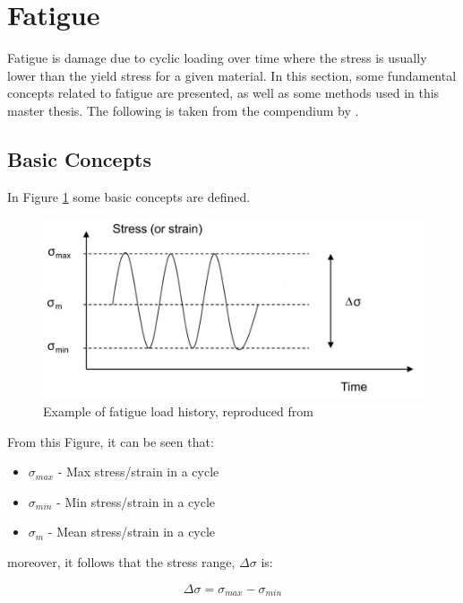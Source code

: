 \section{Fatigue}
Fatigue is damage due to cyclic loading over time where the stress is usually lower than the yield stress for a given material. In this section, some fundamental concepts related to fatigue are presented, as well as some methods used in this master thesis. The following is taken from the compendium by \cite{fatigue2016}. \newline
\newline
\subsection{Basic Concepts}
In Figure \ref{fig:fatigue} some basic concepts are defined. 

\begin{figure}[h!]
\centering
\includegraphics[scale=0.6]{figures/cycle}
\caption[$\; \:$Example of fatigue load history]{Example of fatigue load history, reproduced from  \cite{fatigue2016} }
 \label{fig:fatigue}
\end{figure}

From this Figure, it can be seen that:
\begin{itemize}
    \item $\sigma_{max}$ -  Max stress/strain in a cycle
    \item $\sigma_{min}$ -  Min stress/strain in a cycle
    \item $\sigma_{m}$ - Mean stress/strain in a cycle
\end{itemize}

moreover, it follows that the stress range, $\Delta \sigma$ is:

\begin{equation}
    \Delta \sigma =\sigma_{max} - \sigma_{min}
\end{equation}

